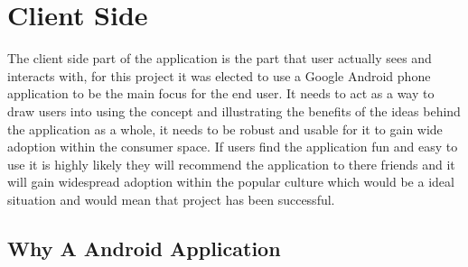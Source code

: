 \section{Client Side}


The client side part of the application is the part that user actually sees and interacts with, for this project it was elected to use a Google Android phone application to be the main focus for the end user. It needs to act as a way to draw users into using the concept and illustrating the benefits of the ideas behind the application as a whole, it needs to be robust and usable for it to gain wide adoption within the consumer space. If users find the application fun and easy to use it is highly likely they will recommend the application to there friends and it will gain widespread adoption within the popular culture which would be a ideal situation and would mean that project has been successful.

\subsection{Why A Android Application}

